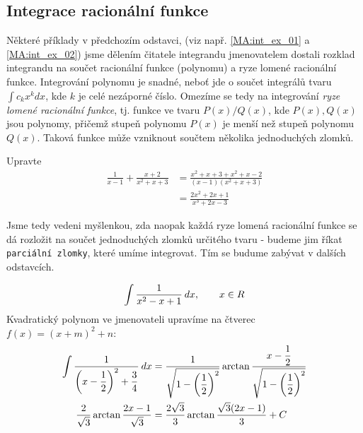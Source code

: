     \subsection{Integrace racionální funkce}
      Některé příklady v předchozím odstavci, (viz např. \ref{MA:int_ex_01} a 
      \ref{MA:int_ex_02}) jsme dělením čitatele integrandu jmenovatelem dostali rozklad
      integrandu na součet racionální funkce (polynomu) a ryze lomené racionální funkce.
      Integrování polynomu je snadné, neboť jde o součet integrálů tvaru $\int c_kx^k dx$, kde
      $k$ je celé nezáporné číslo. Omezíme se tedy na integrování \emph{ryze lomené racionální
      funkce},  tj. funkce ve tvaru $P(x)/Q(x)$, kde $P(x), Q(x)$ jsou polynomy, přičemž stupeň
      polynomu $P(x)$ je menší než stupeň polynomu $Q(x)$. Taková funkce může vzniknout součtem
      několika jednoduchých zlomků.
      
      \begin{example}
        Upravte
        \begin{align*}
          \frac{1}{x-1}+\frac{x+2}{x^2+x+3} 
            & = \frac{x^2+x+3+x^2+x-2}{(x-1)(x^2+x+3)}              \\
            & = \frac{2x^2+2x+1}{x^3+2x-3}
        \end{align*}          
      \end{example}
      
      Jsme tedy vedeni myšlenkou, zda naopak každá ryze lomená racionální funkce se dá rozložit
      na součet jednoduchých zlomků určitého tvaru - budeme jim říkat \texttt{parciální zlomky},
      které umíme integrovat. Tím se budume zabývat v dalších odstavcích. 
            
      \begin{example}
        \begin{equation}
          \int\frac{1}{x^2 - x + 1}\hspace{2pt}dx, \qquad x\in R
        \end{equation}
        Kvadratický polynom ve jmenovateli upravíme na čtverec $f(x) = (x + m)^2 + n$:
        \begin{align*}
          \int\dfrac{1}{\left(x-\dfrac{1}{2}\right)^2+\dfrac{3}{4}}\hspace{2pt}dx   &=
            \dfrac{1}{\sqrt{1-\left(\dfrac{1}{2}\right)^2}}\arctan
            \dfrac{x-\dfrac{1}{2}}{\sqrt{1-\left(\dfrac{1}{2}\right)^2}}                       \\
          \dfrac{2}{\sqrt{3}}\arctan\dfrac{2x-1}{\sqrt{3}}               &=
            \dfrac{2\sqrt{3}}{3}\arctan\dfrac{\sqrt{3}(2x-1)}{3} + C
        \end{align*}
      \end{example}     
      
